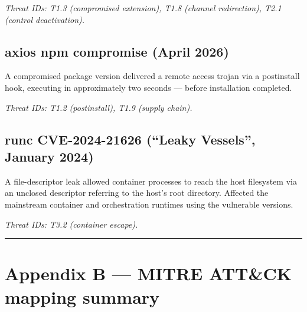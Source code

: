 \emph{Threat IDs: T1.3 (compromised extension), T1.8 (channel
redirection), T2.1 (control deactivation).}

\hypertarget{axios-npm-compromise-april-2026}{%
\section{axios npm compromise (April
2026)}\label{axios-npm-compromise-april-2026}}

A compromised package version delivered a remote access trojan via a
postinstall hook, executing in approximately two seconds --- before
installation completed.

\emph{Threat IDs: T1.2 (postinstall), T1.9 (supply chain).}

\hypertarget{runc-cve-2024-21626-leaky-vessels-january-2024}{%
\section{runc CVE-2024-21626 (``Leaky Vessels'', January
2024)}\label{runc-cve-2024-21626-leaky-vessels-january-2024}}

A file-descriptor leak allowed container processes to reach the host
filesystem via an unclosed descriptor referring to the host's root
directory. Affected the mainstream container and orchestration runtimes
using the vulnerable versions.

\emph{Threat IDs: T3.2 (container escape).}

\begin{center}\rule{0.5\linewidth}{0.5pt}\end{center}

\hypertarget{appendix-b-mitre-attck-mapping-summary}{%
\chapter{Appendix B --- MITRE ATT\&CK mapping
summary}\label{appendix-b-mitre-attck-mapping-summary}}

